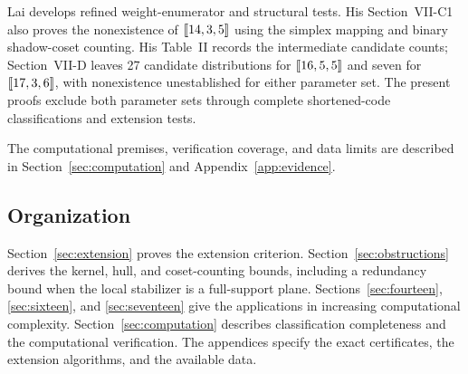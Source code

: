 Lai \cite{lai} develops refined weight-enumerator and structural tests.
His Section~VII-C1 also proves the nonexistence of \([\![14,3,5]\!]\)
using the simplex mapping and binary shadow-coset counting.
His Table~II records the intermediate candidate counts; Section~VII-D
leaves 27 candidate distributions for \([\![16,5,5]\!]\) and seven for
\([\![17,3,6]\!]\), with nonexistence unestablished for either parameter
set. The present proofs exclude both parameter sets through complete
shortened-code classifications and extension tests.

The computational premises, verification coverage, and data limits are
described in Section~\ref{sec:computation} and
Appendix~\ref{app:evidence}.

\subsection{Organization}

Section~\ref{sec:extension} proves the extension criterion.
Section~\ref{sec:obstructions} derives the kernel, hull, and coset-counting
bounds, including a redundancy bound when the local stabilizer is a
full-support plane. Sections~\ref{sec:fourteen}, \ref{sec:sixteen}, and
\ref{sec:seventeen} give the applications in increasing computational complexity. Section~\ref{sec:computation} describes classification
completeness and the computational verification. The appendices specify
the exact certificates, the extension algorithms, and the available data.
